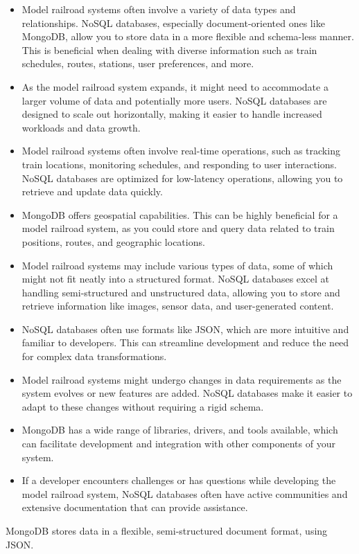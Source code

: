 \begin{itemize}
\item  Model railroad systems often involve a variety of data types and relationships. NoSQL databases, especially document-oriented ones like MongoDB, allow you to store data in a more flexible and schema-less manner. This is beneficial when dealing with diverse information such as train schedules, routes, stations, user preferences, and more.
\item  As the model railroad system expands, it might need to accommodate a larger volume of data and potentially more users. NoSQL databases are designed to scale out horizontally, making it easier to handle increased workloads and data growth.
\item  Model railroad systems often involve real-time operations, such as tracking train locations, monitoring schedules, and responding to user interactions. NoSQL databases are optimized for low-latency operations, allowing you to retrieve and update data quickly.
\item  MongoDB offers geospatial capabilities. This can be highly beneficial for a model railroad system, as you could store and query data related to train positions, routes, and geographic locations.
\item  Model railroad systems may include various types of data, some of which might not fit neatly into a structured format. NoSQL databases excel at handling semi-structured and unstructured data, allowing you to store and retrieve information like images, sensor data, and user-generated content.
\item  NoSQL databases often use formats like JSON, which are more intuitive and familiar to developers. This can streamline development and reduce the need for complex data transformations.
\item  Model railroad systems might undergo changes in data requirements as the system evolves or new features are added. NoSQL databases make it easier to adapt to these changes without requiring a rigid schema.
\item  MongoDB has a wide range of libraries, drivers, and tools available, which can facilitate development and integration with other components of your system.
\item  If a developer encounters challenges or has questions while developing the model railroad system, NoSQL databases often have active communities and extensive documentation that can provide assistance.
\end{itemize}
MongoDB stores data in a flexible, semi-structured document format, using JSON.
